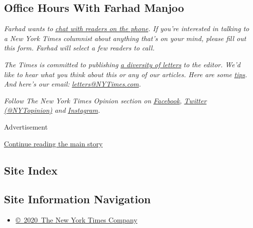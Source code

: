 \hypertarget{office-hours-with-farhad-manjoo}{%
\subsection{Office Hours With Farhad
Manjoo}\label{office-hours-with-farhad-manjoo}}

\emph{Farhad wants to}
\href{https://www.nytimes3xbfgragh.onion/2019/05/16/opinion/farhad-office-hours.html?module=inline}{\emph{chat
with readers on the phone}}\emph{. If you're interested in talking to a
New York Times columnist about anything that's on your mind, please fill
out this form. Farhad will select a few readers to call.}

\emph{The Times is committed to publishing}
\href{https://www.nytimes3xbfgragh.onion/2019/01/31/opinion/letters/letters-to-editor-new-york-times-women.html}{\emph{a
diversity of letters}} \emph{to the editor. We'd like to hear what you
think about this or any of our articles. Here are some}
\href{https://help.nytimes3xbfgragh.onion/hc/en-us/articles/115014925288-How-to-submit-a-letter-to-the-editor}{\emph{tips}}\emph{.
And here's our email:}
\href{mailto:letters@NYTimes.com}{\emph{letters@NYTimes.com}}\emph{.}

\emph{Follow The New York Times Opinion section on}
\href{https://www.facebookcorewwwi.onion/nytopinion}{\emph{Facebook}}\emph{,}
\href{http://twitter.com/NYTOpinion}{\emph{Twitter (@NYTopinion)}}
\emph{and}
\href{https://www.instagram.com/nytopinion/}{\emph{Instagram}}\emph{.}

Advertisement

\protect\hyperlink{after-bottom}{Continue reading the main story}

\hypertarget{site-index}{%
\subsection{Site Index}\label{site-index}}

\hypertarget{site-information-navigation}{%
\subsection{Site Information
Navigation}\label{site-information-navigation}}

\begin{itemize}
\tightlist
\item
  \href{https://help.nytimes3xbfgragh.onion/hc/en-us/articles/115014792127-Copyright-notice}{©~2020~The
  New York Times Company}
\end{itemize}

